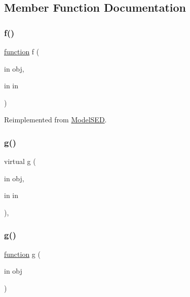\subsection{Member Function Documentation}
\mbox{\label{class_model_pacman_a6f3b146c92a207e95690d08975e1e072}} 
\subsubsection{\texorpdfstring{f()}{f()}}
{\footnotesize\ttfamily \hyperlink{_plan__desuma_functions_8m_ac2ffb26d6f42d3bbcd7847b0873403f4}{function} f (\begin{DoxyParamCaption}\item[{in}]{obj,  }\item[{in}]{in }\end{DoxyParamCaption})\hspace{0.3cm}{\ttfamily [virtual]}}



Reimplemented from \hyperlink{class_model_s_e_d_ac36f9451c43b120828af4380858f2024}{Model\+S\+ED}.

\mbox{\label{class_model_s_e_d_a2d53b5f665cfcf64d482bbfa8a6eb098}} 
\subsubsection{\texorpdfstring{g()}{g()}\hspace{0.1cm}{\footnotesize\ttfamily [1/2]}}
{\footnotesize\ttfamily virtual g (\begin{DoxyParamCaption}\item[{in}]{obj,  }\item[{in}]{in }\end{DoxyParamCaption})\hspace{0.3cm}{\ttfamily [virtual]}, {\ttfamily [inherited]}}

\mbox{\label{class_model_pacman_a07dadfabe92bf9a144b8a862720e7746}} 
\subsubsection{\texorpdfstring{g()}{g()}\hspace{0.1cm}{\footnotesize\ttfamily [2/2]}}
{\footnotesize\ttfamily \hyperlink{_plan__desuma_functions_8m_ac2ffb26d6f42d3bbcd7847b0873403f4}{function} g (\begin{DoxyParamCaption}\item[{in}]{obj }\end{DoxyParamCaption})}

